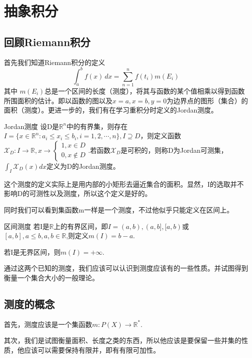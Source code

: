 \chapter{抽象积分}

\section{回顾Riemann积分}
首先我们知道Riemann积分的定义
$$\int_{a}^{b} f(x) \,dx=\sum_{n = 1}^{n}f(t_{i})m(E_{i}) $$
其中 $m(E_{i})$总是一个区间的长度（测度），将其与函数的某个值相乘以得到函数所围面积的估计。即以函数的图以及$x=a,x=b,y=0$为边界点的图形（集合）的面积（测度）。更进一步的，我们有在学习重积分时定义的Jordan测度。
\begin{definition}{Jordan测度}
设D是$\mathbb{R}^{n}$中的有界集，则存在$I=\{x\in \mathbb{R}^{n}:a_{i}\leqslant x_{i}\leqslant b_{i},i=1,2,\cdots ,n\},I\supseteq D$，则定义函数$\mathcal{X}_D:I\to \mathbb{R},x\to \left\{
    \begin{array}{ll}
        1,x\in D \\
        0,x\notin D 
    \end{array}
\right.$.若函数$\mathcal{X}_{D}$是可积的，则称D为Jordan可测集，$\int_{I}\mathcal{X}_{D}(x)dx$定义为D的Jordan测度。
\end{definition}
这个测度的定义实际上是用内部的小矩形去逼近集合的面积。显然，I的选取并不影响D的可测性以及测度，所以这个定义是好的。
\par
同时我们可以看到集函数m一样是一个测度，不过他似乎只能定义在区间上。
\begin{definition}{区间测度}
若I是$\mathbb{R} $上的有界区间，即$I=(a,b),(a,b],[a,b)$或$[a,b],a\leqslant b,a,b\in \mathbb{R}$,则定义$m(I)=b-a$.
\par
若I是无界区间，则$m(I)=+\infty. $
\end{definition}
通过这两个已知的测度，我们应该可以认识到测度应该有的一些性质。并试图得到衡量一个集合大小的一般理论。
\section{测度的概念}
首先，测度应该是一个集函数$m:P(X)\to \mathbb{R}^{*}$.
\par
其次，我们是试图衡量面积、长度之类的东西，所以他应该是要保留一些并集的性质，他应该可以需要保持有限并，即有有限可加性。